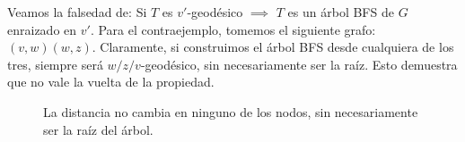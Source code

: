 \documentclass{article}
\begin{document}
Veamos la falsedad de: Si \( T \) es \( v' \)-geodésico \(\implies\) \( T \) es un árbol BFS de \( G \) enraizado en \( v' \). Para el contraejemplo, tomemos el siguiente grafo: \( (v,w)(w,z) \). Claramente, si construimos el árbol BFS desde cualquiera de los tres, siempre será \( w/z/v \)-geodésico, sin necesariamente ser la raíz. Esto demuestra que no vale la vuelta de la propiedad.

\begin{figure}
    \centering
    \begin{minipage}{0.45\textwidth}
        \centering
       
    \end{minipage}
    \hfill
    \begin{minipage}{0.45\textwidth}
        \centering
       
    \end{minipage}
     \caption{La distancia no cambia en ninguno de los nodos, sin necesariamente ser la raíz del árbol.}
\end{figure}
\end{document}
